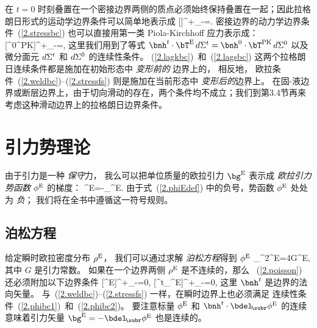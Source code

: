 在 $t=0$ 时刻叠置在一个密接边界两侧的质点必须始终保持叠置在一起；因此拉格朗日形式的运动学边界条件可以简单地表示成
\eq
\label{2.lagkbc}
[\br]^+_-=\bzero.
\en
密接边界的动力学边界条件~(\ref{2.stressbc}) 也可以直接用第一类 Piola-Kirchhoff 应力表示成：
\eq
\label{2.lagsbc}
[\bnh^0\cdot\bT^{\rm PK}]^+_-=\bzero,
\en
这里我们用到了等式
$\bnh^t\cdot\bT^{\rm E}\,d\/\Sigma^t=
\bnh^0\cdot\bT^{\rm PK}\,d\/\Sigma^0$ 以及微分面元 $d\/\Sigma^t$
和 $d\/\Sigma^0$ 的连续性条件。  (\ref{2.lagkbc})~和~(\ref{2.lagsbc}) 这两个拉格朗日连续条件都是施加在初始形态中 {\em 变形前的\/} 边界上的，
%
%
相反地，
欧拉条件~(\ref{2.weldbc})--(\ref{2.stressfs})
则是施加在当前形态中 {\em 变形后的\/}边界上。
在固-液边界或断层边界上，由于切向滑动的存在，两个条件均不成立；我们到第3.4节再来考虑这种滑动边界上的拉格朗日边界条件。
%
%

\section{引力势理论}
%

由于引力是一种 {\em 保守\/}力，
%
%
我么可以把单位质量的欧拉引力 $\bg^{\rm E}$ 表示成 {\em 欧拉引力势函数\/} 
%
$\phi^{\rm E}$ 的梯度：
\eq
\label{2.phiEdef}
\bg^{\rm E}=-\bdel_{\!\subr}\phi^{\rm E}.
\en
由于式~(\ref{2.phiEdef}) 中的负号，势函数 $\phi^{\rm E}$ 处处为 {\em 负\/}；
我们将在全书中遵循这一符号规则。

\subsection{泊松方程}
%

给定瞬时欧拉密度分布 $\rho^{\rm E}$，
我们可以通过求解 {\em 泊松方程}得到 $\phi^{\rm E}$ 
\eq
\label{2.poisson}
\nabla_{\!\subr}^2\phi^{\rm E}=4\pi G\rho^{\rm E},
\en
其中 $G$ 是引力常数。
如果在一个边界两侧 $\rho^{\rm E}$ 是不连续的，那么
~(\ref{2.poisson}) 还必须附加以下边界条件
\eq
\label{2.phibc1}
[\phi^{\rm E}]^+_-=0,
\en
\eq
\label{2.phibc2}
[\bnh^t\cdot\bdel_{\!\subr}\phi^{\rm E}]^+_-=0,
\en
这里 $\bnh^t$ 是边界的法向矢量。
与~(\ref{2.weldbc})--(\ref{2.stressfs}) 一样，在瞬时边界上也必须满足
连续性条件~(\ref{2.phibc1})~和~(\ref{2.phibc2})。
%
%
要注意标量 $\phi^{\rm E}$ 和
$\bnh^t\cdot\bdel_{\!\subr}\phi^{\rm E}$ 的连续意味着引力矢量
$\bg^{\rm E}=-\bdel_{\!\subr}\phi^{\rm E}$ 也是连续的。
 
